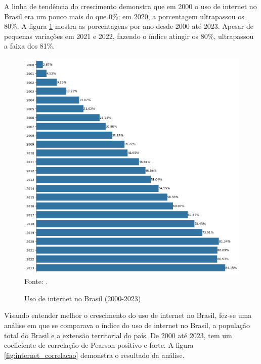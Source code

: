 A linha de tendência do crescimento demonstra que em 2000 o uso de internet no Brasil era um pouco mais do que 0\%; em 2020, a porcentagem ultrapassou os 80\%. A figura \ref{fig:uso_internet_brasil_itu} mostra as porcentagens por ano desde 2000 até 2023. Apesar de pequenas variações em 2021 e 2022, fazendo o índice atingir os 80\%, ultrapassou a faixa dos 81\%.

\begin{figure}[H]
    \centering
    \caption{Uso de internet no Brasil (2000-2023)}
    \includegraphics[width=1\linewidth]{figuras/internet/barplot_uso_internet_brasil_itu.png}
    \label{fig:uso_internet_brasil_itu}
    \footnotesize{Fonte: \cite{ITU_uso_internet_brasil}.}
\end{figure}

Visando entender melhor o crescimento do uso de internet no Brasil, fez-se uma análise em que se comparava o índice do uso de internet no Brasil, a população total do Brasil e a extensão territorial do país. De 2000 até 2023, tem um coeficiente de correlação de Pearson positivo e forte. A figura \ref{fig:internet_correlacao} demonstra o resultado da análise.

